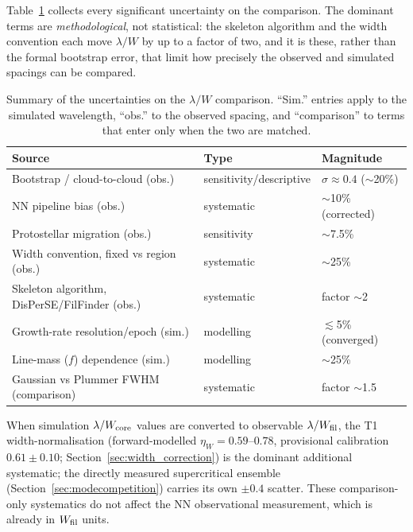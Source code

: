 \documentclass[usenatbib,twoside,twocolumn]{mnras}
\begin{document}
Table~\ref{tab:errorbudget} collects every significant uncertainty on the comparison. The dominant terms are \emph{methodological}, not statistical: the skeleton algorithm and the width convention each move $\lambda/W$ by up to a factor of two, and it is these, rather than the formal bootstrap error, that limit how precisely the observed and simulated spacings can be compared.

\begin{table}
\caption{Summary of the uncertainties on the $\lambda/W$ comparison. ``Sim.'' entries apply to the simulated wavelength, ``obs.'' to the observed spacing, and ``comparison'' to terms that enter only when the two are matched.}
\label{tab:errorbudget}
\footnotesize
\setlength{\tabcolsep}{3pt}
\begin{tabular}{p{3.6cm}p{1.9cm}p{1.7cm}}
\toprule
Source & Type & Magnitude \\
\midrule
Bootstrap / cloud-to-cloud (obs.) & sensitivity/descriptive & $\sigma\approx0.4$ ($\sim$20\%) \\
NN pipeline bias (obs.) & systematic & $\sim$10\% (corrected) \\
Protostellar migration (obs.) & sensitivity & $\sim$7.5\% \\
Width convention, fixed vs region (obs.) & systematic & $\sim$25\% \\
Skeleton algorithm, DisPerSE/FilFinder (obs.) & systematic & factor $\sim$2 \\
Growth-rate resolution/epoch (sim.) & modelling & $\lesssim$5\% (converged) \\
Line-mass ($f$) dependence (sim.) & modelling & $\sim$25\% \\
Gaussian vs Plummer FWHM (comparison) & systematic & factor $\sim$1.5 \\
\bottomrule
\end{tabular}
\end{table}

When simulation $\lambda/W_{\rm core}$ values are converted to observable $\lambda/W_{\rm fil}$, the T1 width-normalisation (forward-modelled $\eta_W=0.59$--$0.78$, provisional calibration $0.61\pm0.10$; Section~\ref{sec:width_correction}) is the dominant additional systematic; the directly measured supercritical ensemble (Section~\ref{sec:modecompetition}) carries its own $\pm0.4$ scatter. These comparison-only systematics do not affect the NN observational measurement, which is already in $W_{\rm fil}$ units.
\end{document}
